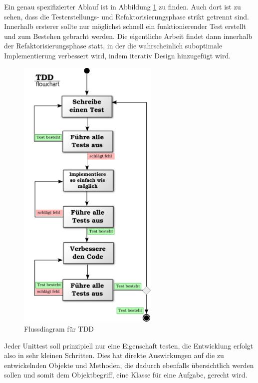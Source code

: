   Ein genau spezifizierter Ablauf ist in Abbildung \ref{fig:tddflow} zu finden. Auch dort ist zu sehen, dass die Testerstellungs- und Refaktorisierungsphase strikt getrennt sind. Innerhalb ersterer sollte nur möglichst schnell ein funktionierender Test erstellt und zum Bestehen gebracht werden. Die eigentliche Arbeit findet dann innerhalb der Refaktorisierungsphase statt, in der die wahrscheinlich suboptimale Implementierung verbessert wird, indem iterativ Design hinzugefügt wird.
  \begin{figure}[hp]
 \centering
 \includegraphics[width=0.6\textwidth]{./diagrams/tdd-flowchart.pdf}
 \caption{Flussdiagram für TDD}
 \label{fig:tddflow}
\end{figure}


  Jeder Unittest soll prinzipiell nur eine Eigenschaft testen, die Entwicklung erfolgt also in sehr kleinen Schritten. Dies hat direkte Auswirkungen auf die zu entwickelnden Objekte und Methoden, die dadurch ebenfalls übersichtlich werden sollen und somit dem Objektbegriff, eine Klasse für eine Aufgabe, gerecht wird.

